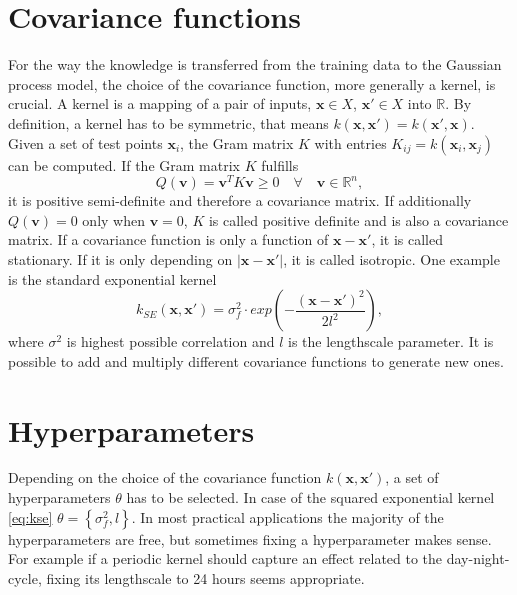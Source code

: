 \section{Covariance functions}
\label{sec:covfun}
For the way the knowledge is transferred from the training data to the Gaussian process model, the choice of the covariance function, more generally a kernel, is crucial.
A kernel is a mapping of a pair of inputs, $\mathbf{x} \in X$, $\mathbf{x}' \in X$ into $\mathbb{R}$.
By definition, a kernel has to be symmetric, that means $k(\mathbf{x},\mathbf{x}') = k(\mathbf{x}',\mathbf{x})$.
Given a set of test points $\mathbf{x}_i$, the Gram matrix $K$ with entries $K_{ij} = k(\mathbf{x}_i,\mathbf{x}_j)$ can be computed.
If the Gram matrix $K$ fulfills
\begin{equation}\label{eq:psd}
Q(\mathbf{v})=\mathbf{v}^T K \mathbf{v} \geq 0 \quad \forall \quad \mathbf{v} \in \mathbb{R}^n,
\end{equation}
it is positive semi-definite and therefore a covariance matrix. If additionally $Q(\mathbf{v})=0$ only when $\mathbf{v}=0$, $K$ is called positive definite and is also a covariance matrix.
If a covariance function is only a function of $\mathbf{x} - \mathbf{x'}$, it is called stationary. If it is only depending on $\left| \mathbf{x} - \mathbf{x'} \right|$, it is called isotropic. One example is the standard exponential kernel
\begin{equation}\label{eq:kse}
k_{SE}\left(\mathbf{x}, \mathbf{x}'\right)= \sigma_f^2 \cdot exp \left(-\frac{\left(\mathbf{x}-\mathbf{x}'\right)^2}{2l^2}\right),
\end{equation}
where $\sigma^2$ is highest possible correlation and $l$ is the lengthscale parameter.
It is possible to add and multiply different covariance functions to generate new ones.


\section{Hyperparameters}
\label{sec:hyper}
Depending on the choice of the covariance function $k(\mathbf{x},\mathbf{x}')$, a set of hyperparameters $\theta$ has to be selected.
In case of the squared exponential kernel \ref{eq:kse} $\theta = \left\{\sigma_f^2,l\right\}$.
In most practical applications the majority of the hyperparameters are free, but sometimes fixing a hyperparameter makes sense.
For example if a periodic kernel should capture an effect related to the day-night-cycle, fixing its lengthscale to 24 hours seems appropriate.

